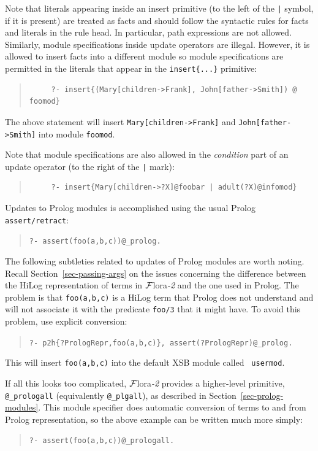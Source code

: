 \documentclass[11pt]{article}
\newcommand{\FLORA}{{\mbox{\sc ${\cal F}${lora}\rm\emph{-2}}}\xspace}
\begin{document}
Note that literals appearing inside an insert primitive (to the left of the
\verb'|' symbol, if it is present) are treated as
facts and should follow the syntactic rules for facts and literals in the
rule head. In particular, path expressions are not allowed.
Similarly, module specifications inside update operators are illegal.
However, it is allowed to insert facts into a different module so module
specifications are permitted in the literals that appear in the 
{\tt insert\{...\}} primitive:
\begin{quote}
\begin{verbatim}
     ?- insert{(Mary[children->Frank], John[father->Smith]) @ foomod}
\end{verbatim}
\end{quote}
The above statement will insert {\tt Mary[children->Frank]} and
{\tt John[father->Smith]} into module {\tt foomod}.

Note that module specifications are also allowed in the
\emph{condition} part of an update operator (to the right of the \verb'|'
mark):
\begin{quote}
\begin{verbatim}
     ?- insert{Mary[children->?X]@foobar | adult(?X)@infomod}
\end{verbatim}
\end{quote}

Updates to Prolog modules is accomplished using the usual
Prolog {\tt assert/retract}:
\begin{quote}
 {\tt ?- assert(foo(a,b,c))@\_prolog.  }
\end{quote}
The following subtleties related to updates of Prolog modules are worth
noting. Recall Section~\ref{sec-passing-args} on the issues concerning the
difference between the HiLog representation of terms in \FLORA and the one
used in Prolog. The problem is that {\tt foo(a,b,c)} is a HiLog term that
Prolog does not understand and will not associate it with the predicate
{\tt foo/3} that it might have. To avoid this problem, use explicit conversion:
\begin{quote}
 {\tt ?- p2h\{?PrologRepr,foo(a,b,c)\}, assert(?PrologRepr)@\_prolog.  }
\end{quote}
This will insert {\tt foo(a,b,c)} into the default XSB module called {\tt
  usermod}.

If all this looks too complicated, \FLORA provides a higher-level
primitive, {\tt @\_prologall} (equivalently {\tt @\_plgall}), as described in
Section~\ref{sec-prolog-modules}. This module specifier does automatic
conversion of terms to and from Prolog representation, so the above example
can be written much more simply:
\begin{quote}
 {\tt ?- assert(foo(a,b,c))@\_prologall.  }  
\end{quote}
\end{document}
